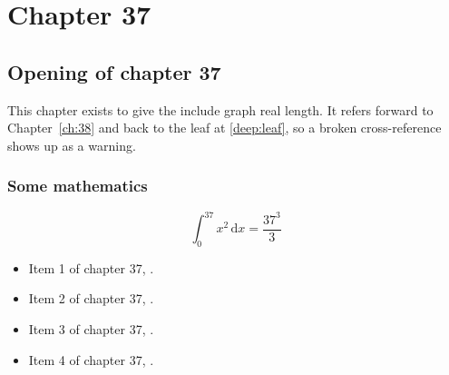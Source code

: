 \chapter{Chapter 37}
\label{ch:37}
\section{Opening of chapter 37}
This chapter exists to give the include graph real length. It refers
forward to Chapter~\ref{ch:38} and back to the leaf
at \ref{deep:leaf}, so a broken cross-reference shows up as a warning.

\subsection{Some mathematics}
\begin{equation}
  \int_0^{37} x^{2} \, \mathrm{d}x = \frac{37^{3}}{3}
\end{equation}

\begin{itemize}
  \item Item 1 of chapter 37, .
  \item Item 2 of chapter 37, .
  \item Item 3 of chapter 37, .
  \item Item 4 of chapter 37, .
\end{itemize}
